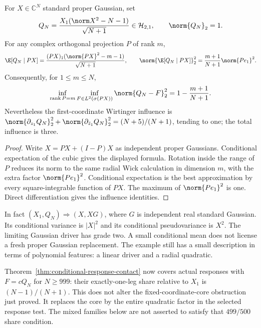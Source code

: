 \begin{theorem}
\label{thm:joint-radial-core}
For $X\in\mathbb C^N$ standard proper Gaussian, set
\[
 Q_N=\frac{X_1(\norm X^2-N-1)}{\sqrt{N+1}}\in\mathcal H_{2,1},
 \qquad \norm{Q_N}_2=1.
\]
For any complex orthogonal projection $P$ of rank $m$,
\[
 \E[Q_N\mid PX]
 =\frac{(PX)_1(\norm{PX}^2-m-1)}{\sqrt{N+1}},\qquad
 \norm{\E[Q_N\mid PX]}_2^2
 =\frac{m+1}{N+1}\norm{Pe_1}^2.
\]
Consequently, for $1\le m\le N$,
\[
 \inf_{\operatorname{rank}P=m}\inf_{F\in L^2(\sigma(PX))}
 \norm{Q_N-F}_2^2=1-\frac{m+1}{N+1}.
\]
Nevertheless the first-coordinate Wirtinger influence is
$\norm{\partial_{z_1}Q_N}_2^2+\norm{\partial_{\bar z_1}Q_N}_2^2
=(N+5)/(N+1)$, tending to one; the total influence is three.
\end{theorem}
\begin{proof}
Write $X=PX+(I-P)X$ as independent proper Gaussians. Conditional
expectation of the cubic gives the displayed formula. Rotation inside
the range of $P$ reduces its norm to the same radial Wick calculation
in dimension $m$, with the extra factor $\norm{Pe_1}^2$.
Conditional expectation is the best approximation by every
square-integrable function of $PX$. The maximum of $\norm{Pe_1}^2$ is
one. Direct differentiation gives the influence identities.
\end{proof}

In fact $(X_1,Q_N)\Rightarrow(X,XG)$, where $G$ is independent real
standard Gaussian. Its conditional variance is $|X|^2$ and its
conditional pseudovariance is $X^2$. The limiting Gaussian driver has
grade two. A small conditional mean does not license a fresh proper
Gaussian replacement. The example still has a small description in
terms of polynomial features: a linear driver and a radial quadratic.

Theorem~\ref{thm:conditional-response-contact} now covers actual responses
with $F=cQ_N$ for $N\ge999$: their exactly-one-leg share relative to
$X_1$ is $(N-1)/(N+1)$. This does not alter the fixed-coordinate-core
obstruction just proved. It replaces the core by the entire quadratic
factor in the selected response test. The mixed families below are
not asserted to satisfy that $499/500$ share condition.

